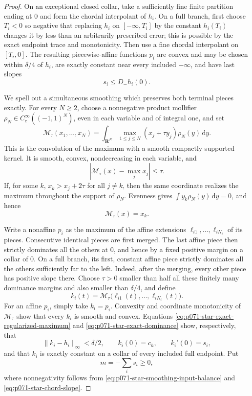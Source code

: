 \begin{proof}
On an exceptional closed collar, take a sufficiently fine finite
partition ending at \(0\) and form the chordal interpolant of \(h_i\).
On a full branch, first choose \(T_i<0\) so negative that replacing
\(h_i\) on \([-\infty,T_i]\) by the constant \(h_i(T_i)\) changes it by
less than an arbitrarily prescribed error; this is possible by the exact
endpoint trace and monotonicity.  Then use a fine chordal interpolant on
\([T_i,0]\).  The resulting piecewise-affine functions \(p_i\) are
convex and may be chosen within \(\delta/4\) of \(h_i\), are exactly
constant near every included
\(-\infty\), and have last slopes
\begin{equation}
                         s_i\leq D_-h_i(0).
 \label{eq:p071-star-chord-slope}
\end{equation}

We spell out a simultaneous smoothing which preserves both terminal
pieces exactly.  For every \(N\geq2\), choose a nonnegative product
mollifier \(\rho_N\in C^\infty_c((-1,1)^N)\), even in each variable and
of integral one, and set
\begin{equation}
 \mathcal M_\tau(x_1,\ldots,x_N)
   =\int_{\mathbf R^N}
      \max_{1\leq j\leq N}(x_j+\tau y_j)\rho_N(y)\,\mathrm dy .
 \label{eq:p071-star-exact-regularized-maximum}
\end{equation}
This is the convolution of the maximum with a smooth compactly supported
kernel.  It is smooth, convex, nondecreasing in each variable, and
\[
 \left|\mathcal M_\tau(x)-\max_jx_j\right|\leq\tau.
\]
If, for some \(k\), \(x_k>x_j+2\tau\) for all \(j\ne k\), then the same
coordinate realizes the maximum throughout the support of \(\rho_N\).
Evenness gives \(\int y_k\rho_N(y)\,\mathrm dy=0\), and hence
\begin{equation}
                    \mathcal M_\tau(x)=x_k .
 \label{eq:p071-star-exact-dominance}
\end{equation}

Write a nonaffine \(p_i\) as the maximum of the affine extensions
\(\ell_{i1},\ldots,\ell_{iN_i}\) of its pieces.  Consecutive identical
pieces are first merged.  The last affine piece then strictly dominates
all the others at \(0\), and hence by a fixed positive margin on a
collar of \(0\).  On a full branch, its first, constant affine piece
strictly dominates all the others sufficiently far to the left.  Indeed,
after the merging, every other piece has positive slope there.  Choose
\(\tau>0\) smaller than half all these finitely many dominance margins
and also smaller than \(\delta/4\), and define
\[
 k_i(t)=\mathcal M_\tau
       \bigl(\ell_{i1}(t),\ldots,\ell_{iN_i}(t)\bigr).
\]
For an affine \(p_i\), simply take \(k_i=p_i\).  Convexity and coordinate
monotonicity of \(\mathcal M_\tau\) show that every \(k_i\) is smooth
and convex.  Equations
\eqref{eq:p071-star-exact-regularized-maximum} and
\eqref{eq:p071-star-exact-dominance} show, respectively, that
\[
 \lVert k_i-h_i\rVert_\infty<\delta/2,
 \qquad k_i(0)=c_h,\qquad k_i'(0)=s_i,
\]
and that \(k_i\) is exactly constant on a collar of every included full
endpoint.  Put
\[
                         m=-\sum_i s_i\geq0,
\]
where nonnegativity follows from
\eqref{eq:p071-star-smoothing-input-balance} and
\eqref{eq:p071-star-chord-slope}.


\end{proof}
